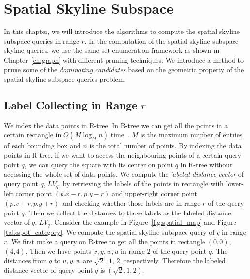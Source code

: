 
%
%

\chapter{Spatial Skyline Subspace}
\label{ch:spatial}

In this chapter, we will introduce the algorithms to compute the spatial skyline subspace queries in range $r$. In the computation of the spatial skyline subspace skyline queries, we use the same set enumeration framework as shown in Chapter~\ref{ch:graph} with different pruning techniques. We introduce a method to prune some of the \emph{dominating candidates} based on the geometric property of the spatial skyline subspace queries problem.

\section{Label Collecting in Range $r$}
We index the data points in R-tree. In R-tree we can get all the points in a certain rectangle in $O(M \log_M n)$ time~\cite{guttman1984r}. $M$ is the maximum number of entries of each bounding box and $n$ is the total number of points. By indexing the data points in R-tree, if we want to access the neighbouring points of a certain query point $q$, we can query the square with its center on point $q$ in R-tree without accessing the whole set of data points. We compute the \emph{labeled distance vector} of query point $q$, $LV_q$, by retrieving the labels of the points in rectangle with lower-left corner point $(p.x - r, p.y - r)$ and upper-right corner point $(p.x + r, p.y + r)$ and checking whether those labels are in range $r$ of the query point $q$. Then we collect the distances to those labels as the labeled distance vector of $q$, $LV_q$. Consider the example in Figure~\ref{fig:spatial_map} and Figure~ \ref{tab:spot_category}. We compute the spatial skyline subspace query of $q$ in range $r$. We first make a query on R-tree to get all the points in rectangle $(0, 0)$, $(4, 4)$. Then we have points $x, y, w, u$ in range $2$ of the query point $q$. The distances from $q$ to $u, y, w$ are $\sqrt{2}$, $1$, $2$, respectively. Therefore the labeled distance vector of query point $q$ is $(\sqrt{2}, 1, 2)$.

